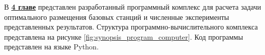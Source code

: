 









В \underline{\textbf{4 главе}} представлен разработанный программный комплекс для расчета задачи оптимального размещения базовых станций и численные эксперименты представленных результатов. Структура программно-вычислительного комплекса представлена на рисунке \ref{fig:synopsis_program_computer}. Код программы представлен на языке Python. 


